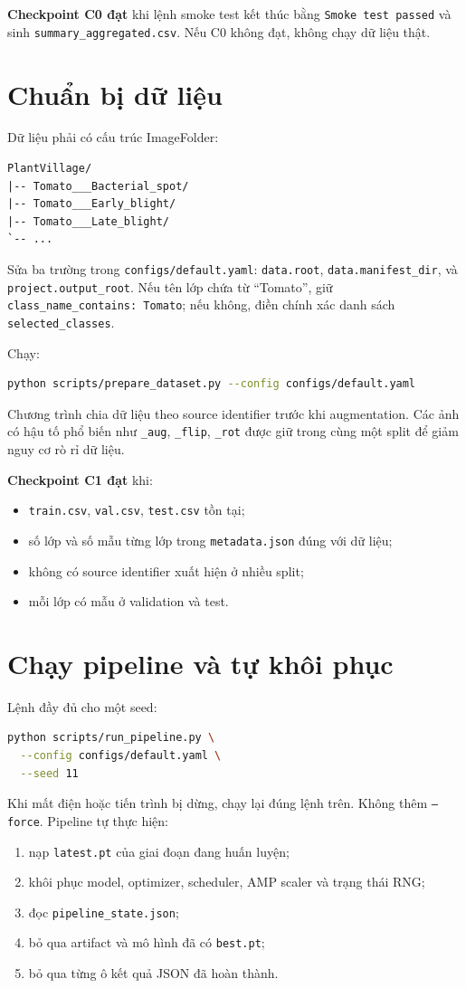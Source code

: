 \documentclass[11pt,journal,onecolumn]{IEEEtran}
\begin{document}
\textbf{Checkpoint C0 đạt} khi lệnh smoke test kết thúc bằng \texttt{Smoke test passed} và sinh \texttt{summary\_aggregated.csv}. Nếu C0 không đạt, không chạy dữ liệu thật.

\section{Chuẩn bị dữ liệu}
Dữ liệu phải có cấu trúc ImageFolder:
\begin{lstlisting}
PlantVillage/
|-- Tomato___Bacterial_spot/
|-- Tomato___Early_blight/
|-- Tomato___Late_blight/
`-- ...
\end{lstlisting}

Sửa ba trường trong \texttt{configs/default.yaml}: \texttt{data.root}, \texttt{data.manifest\_dir}, và \texttt{project.output\_root}. Nếu tên lớp chứa từ ``Tomato'', giữ \texttt{class\_name\_contains: Tomato}; nếu không, điền chính xác danh sách \texttt{selected\_classes}.

Chạy:
\begin{lstlisting}[language=bash]
python scripts/prepare_dataset.py --config configs/default.yaml
\end{lstlisting}

Chương trình chia dữ liệu theo source identifier trước khi augmentation. Các ảnh có hậu tố phổ biến như \texttt{\_aug}, \texttt{\_flip}, \texttt{\_rot} được giữ trong cùng một split để giảm nguy cơ rò rỉ dữ liệu.

\textbf{Checkpoint C1 đạt} khi:
\begin{itemize}
\item \texttt{train.csv}, \texttt{val.csv}, \texttt{test.csv} tồn tại;
\item số lớp và số mẫu từng lớp trong \texttt{metadata.json} đúng với dữ liệu;
\item không có source identifier xuất hiện ở nhiều split;
\item mỗi lớp có mẫu ở validation và test.
\end{itemize}

\section{Chạy pipeline và tự khôi phục}
Lệnh đầy đủ cho một seed:
\begin{lstlisting}[language=bash]
python scripts/run_pipeline.py \
  --config configs/default.yaml \
  --seed 11
\end{lstlisting}

Khi mất điện hoặc tiến trình bị dừng, chạy lại đúng lệnh trên. Không thêm \texttt{--force}. Pipeline tự thực hiện:
\begin{enumerate}
\item nạp \texttt{latest.pt} của giai đoạn đang huấn luyện;
\item khôi phục model, optimizer, scheduler, AMP scaler và trạng thái RNG;
\item đọc \texttt{pipeline\_state.json};
\item bỏ qua artifact và mô hình đã có \texttt{best.pt};
\item bỏ qua từng ô kết quả JSON đã hoàn thành.
\end{enumerate}
\end{document}
